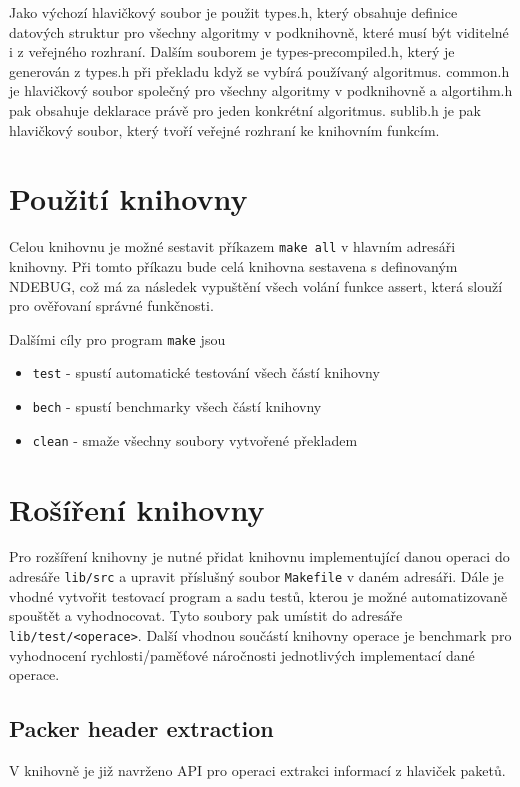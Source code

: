 Jako výchozí hlavičkový soubor je použit types.h, který obsahuje definice datových struktur pro všechny algoritmy v podknihovně, které musí být viditelné i z veřejného rozhraní. Dalším souborem je types-precompiled.h, který je generován z types.h při překladu když se vybírá používaný algoritmus. common.h je hlavičkový soubor společný pro všechny algoritmy v podknihovně a algortihm.h pak obsahuje deklarace právě pro jeden konkrétní algoritmus.
sublib.h je pak hlavičkový soubor, který tvoří veřejné rozhraní ke knihovním funkcím.

\section{Použití knihovny}
Celou knihovnu je možné sestavit příkazem \texttt{make all} v hlavním adresáři knihovny.
Při tomto příkazu bude celá knihovna sestavena s definovaným NDEBUG, což má za následek vypuštění všech
volání funkce assert, která slouží pro ověřovaní správné funkčnosti.

Dalšími cíly pro program \texttt{make} jsou

\begin{itemize}
	\item{\texttt{test} - spustí automatické testování všech částí knihovny}
	\item{\texttt{bech} - spustí benchmarky všech částí knihovny}
	\item{\texttt{clean} - smaže všechny soubory vytvořené překladem}
\end{itemize}

\section{Rošíření knihovny}

Pro rozšíření knihovny je nutné přidat knihovnu implementující danou operaci
do adresáře \texttt{lib/src} a upravit příslušný soubor \texttt{Makefile} v daném adresáři.
Dále je vhodné vytvořit testovací program a sadu testů, kterou je možné automatizovaně spouštět a vyhodnocovat.
Tyto soubory pak umístit do adresáře \texttt{lib/test/<operace>}.
Další vhodnou součástí knihovny operace je benchmark pro vyhodnocení rychlosti/paměťové náročnosti jednotlivých
implementací dané operace.

\subsection{Packer header extraction}
V knihovně je již navrženo API pro operaci extrakci informací z hlaviček paketů.

